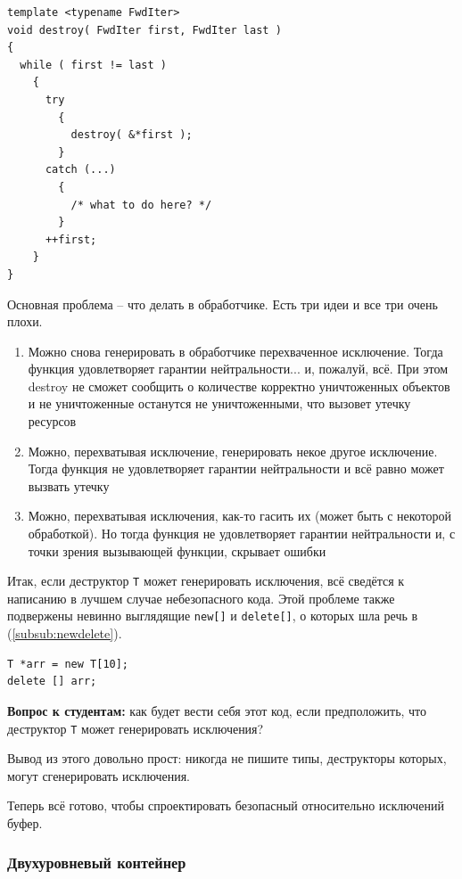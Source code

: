 \documentclass[a4paper,12pt,oneside]{article}
\newif\ifanswers
\begin{document}
\begin{lstlisting}
template <typename FwdIter>
void destroy( FwdIter first, FwdIter last )
{
  while ( first != last )
    {
      try 
        {
          destroy( &*first ); 
        }
      catch (...)
        {
          /* what to do here? */
        }
      ++first;
    }
}
\end{lstlisting}

Основная проблема -- что делать в обработчике. Есть три идеи и все три очень плохи.
\begin{enumerate}
\item
Можно снова генерировать в обработчике перехваченное исключение. Тогда функция удовлетворяет гарантии нейтральности... и, пожалуй, всё. При этом destroy не сможет сообщить о количестве корректно уничтоженных объектов и не уничтоженные останутся не уничтоженными, что вызовет утечку ресурсов
\item
Можно, перехватывая исключение, генерировать некое другое исключение. Тогда функция не удовлетворяет гарантии нейтральности и всё равно может вызвать утечку
\item
Можно, перехватывая исключения, как-то гасить их (может быть с некоторой обработкой). Но тогда функция не удовлетворяет гарантии нейтральности и, с точки зрения вызывающей функции, скрывает ошибки
\end{enumerate}

Итак, если деструктор \lstinline!T! может генерировать исключения, всё сведётся к написанию в лучшем случае небезопасного кода. Этой проблеме также подвержены невинно выглядящие \lstinline!new[]! и \lstinline!delete[]!, о которых шла речь в (\ref{subsub:newdelete}).

\begin{lstlisting}
T *arr = new T[10];
delete [] arr;
\end{lstlisting}

\textbf{Вопрос к студентам:} как будет вести себя этот код, если предположить, что деструктор \lstinline!T! может генерировать исключения?

\ifanswers
TODO: здесь правильный и обоснованный ответ
\fi

Вывод из этого довольно прост: никогда не пишите типы, деструкторы которых, могут сгенерировать исключения. 

Теперь всё готово, чтобы спроектировать безопасный относительно исключений буфер.

\subsubsection{Двухуровневый контейнер}\label{subsub:twolevel}
\end{document}
